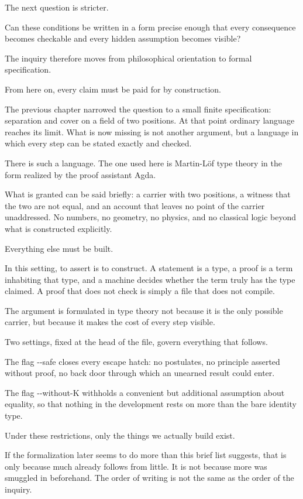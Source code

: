 \documentclass[11pt,a4paper]{book}
\newcommand{\AgdaFlag}[1]{\texttt{-{}-#1}}
\def\texttt#1{#1}%
\begin{document}
The next question is stricter.

Can these conditions be written in a form precise enough that every
consequence becomes checkable and every hidden assumption becomes visible?

The inquiry therefore moves from philosophical orientation to formal
specification.

From here on, every claim must be paid for by construction.

The previous chapter narrowed the question to a small finite
specification: separation and cover on a field of two positions. At that
point ordinary language reaches its limit. What is now missing is not
another argument, but a language in which every step can be stated exactly
and checked.

There is such a language. The one used here is Martin-L\"of type theory in
the form realized by the proof assistant Agda.

What is granted can be said briefly: a carrier with two positions, a
witness that the two are not equal, and an account that leaves no point of
the carrier unaddressed. No numbers, no geometry, no physics, and no
classical logic beyond what is constructed explicitly.

Everything else must be built.

In this setting, to assert is to construct. A statement is a type, a proof
is a term inhabiting that type, and a machine decides whether the term
truly has the type claimed. A proof that does not check is simply a file
that does not compile.

The argument is formulated in type theory not because it is the only
possible carrier, but because it makes the cost of every step visible.

Two settings, fixed at the head of the file, govern everything that
follows.

The flag \AgdaFlag{safe} closes every escape hatch: no postulates, no
principle asserted without proof, no back door through which an unearned
result could enter.

The flag \AgdaFlag{without-K} withholds a convenient but additional
assumption about equality, so that nothing in the development rests on more
than the bare identity type.

Under these restrictions, only the things we actually build exist.

If the formalization later seems to do more than this brief list suggests,
that is only because much already follows from little. It is not because
more was smuggled in beforehand. The order of writing is not the same as 
the order of the inquiry.
\end{document}
